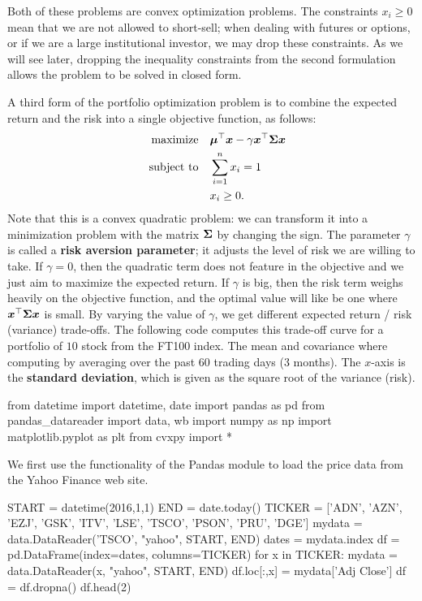 Both of these problems are convex optimization problems. The constraints $x_i\geq 0$ mean that we are not allowed to short-sell; when dealing with futures or options, or if we are a large institutional investor, we may drop these constraints. As we will see later, dropping the inequality constraints from the second formulation allows the problem to be solved in closed form.

A third form of the portfolio optimization problem is to combine the expected return and the risk into a single objective function, as follows:
\begin{align*}
 \text{maximize}\quad & \bm{\mu}^{\top}\bm{x} - \gamma \bm{x}^{\top}\bm{\Sigma}\bm{x}\\
 \quad\text{subject to}\quad & \sum_{i=1}^n x_i = 1\\
 & x_i\geq 0.
\end{align*}
Note that this is a convex quadratic problem: we can transform it into a minimization problem with the matrix $\bm{\Sigma}$ by changing the sign.
The parameter $\gamma$ is called a \textbf{risk aversion parameter}; it adjusts the level of risk we are willing to take. If $\gamma=0$, then the quadratic term does not feature in the objective and we just aim to maximize the expected return. If $\gamma$ is big, then the risk term weighs heavily on the objective function, and the optimal value will like be one where $\bm{x}^{\top}\bm{\Sigma}\bm{x}$ is small. By varying the value of $\gamma$, we get different expected return / risk (variance) trade-offs. The following code computes this trade-off curve for a portfolio of $10$ stock from the FT100 index. The mean and covariance where computing by averaging over the past 60 trading days (3 months). The $x$-axis is the \textbf{standard deviation}, which is given as the square root of the variance (risk). 

\begin{ipythonnb}
from datetime import datetime, date
import pandas as pd
from pandas_datareader import data, wb
import numpy as np
import matplotlib.pyplot as plt
from cvxpy import *
\end{ipythonnb}

We first use the functionality of the Pandas module to load the price data from the Yahoo Finance web site. 

\begin{ipythonnb}
START = datetime(2016,1,1)
END = date.today()
TICKER = ['ADN', 'AZN', 'EZJ', 'GSK', 'ITV', 'LSE', 'TSCO', 'PSON', 'PRU', 'DGE']
mydata = data.DataReader('TSCO', "yahoo", START, END)
dates = mydata.index
df = pd.DataFrame(index=dates, columns=TICKER)
for x in TICKER:
    mydata = data.DataReader(x, "yahoo", START, END)
    df.loc[:,x] = mydata['Adj Close']
df = df.dropna()
df.head(2)
\end{ipythonnb}

